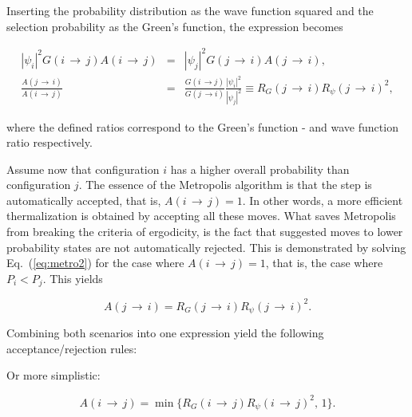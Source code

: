 Inserting the probability distribution as the wave function squared and the selection probability as the Green's function, the expression becomes

\begin{eqnarray}
  \label{eq:metro2}
  |\psi_i|^2G(i\,\rightarrow\,j)A(i\,\rightarrow\,j) &=& |\psi_j|^2G(j\,\rightarrow\,i)A(j\,\rightarrow\,i), \nonumber \\
  \frac{A(j\,\rightarrow\,i)}{A(i\,\rightarrow\,j)} &=& \frac{G(i\,\rightarrow j)}{G(j\,\rightarrow i)}\frac{|\psi_i|^2}{|\psi_j|^2} \equiv R_G(j\,\rightarrow\,i)R_\psi(j\,\rightarrow\,i)^2,
\end{eqnarray}

where the defined ratios correspond to the Green's function - and wave function ratio respectively. 

Assume now that configuration $i$ has a higher overall probability than configuration $j$. The essence of the Metropolis algorithm is that the step is automatically accepted, that is, $A(i\,\rightarrow\,j) = 1$. In other words, a more efficient thermalization is obtained by accepting all these moves. What saves Metropolis from breaking the criteria of ergodicity, is the fact that suggested moves to lower probability states are not automatically rejected. This is demonstrated by solving Eq.~(\ref{eq:metro2}) for the case where $A(i\,\rightarrow\,j) = 1$, that is, the case where $P_i < P_j$. This yields

\begin{equation*}
 A(j\,\rightarrow\,i) = R_G(j\,\rightarrow\,i)R_\psi(j\,\rightarrow\,i)^2.
\end{equation*}


Combining both scenarios into one expression yield the following acceptance/rejection rules:


Or more simplistic:

\begin{equation}
  A(i\,\rightarrow\,j) = \min\{R_G(i\,\rightarrow\,j)R_\psi(i\,\rightarrow\,j)^2, \,1\}.
\end{equation}


